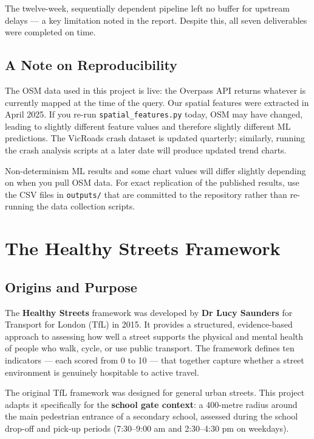 \documentclass[11pt,a4paper,openany]{book}
\begin{document}
The twelve-week, sequentially dependent pipeline left no buffer for upstream delays --- a key limitation noted in the report. Despite this, all seven deliverables were completed on time.

\section{A Note on Reproducibility}

The OSM data used in this project is live: the Overpass API returns whatever is currently mapped at the time of the query. Our spatial features were extracted in April 2025. If you re-run \texttt{spatial\_features.py} today, OSM may have changed, leading to slightly different feature values and therefore slightly different ML predictions. The VicRoads crash dataset is updated quarterly; similarly, running the crash analysis scripts at a later date will produce updated trend charts.

\begin{warnbox}{Non-determinism}
ML results and some chart values will differ slightly depending on when you pull OSM data. For exact replication of the published results, use the CSV files in \texttt{outputs/} that are committed to the repository rather than re-running the data collection scripts.
\end{warnbox}


\chapter{The Healthy Streets Framework}

\section{Origins and Purpose}

The \textbf{Healthy Streets} framework was developed by \textbf{Dr Lucy Saunders} for Transport for London (TfL) in 2015. It provides a structured, evidence-based approach to assessing how well a street supports the physical and mental health of people who walk, cycle, or use public transport. The framework defines ten indicators --- each scored from 0 to 10 --- that together capture whether a street environment is genuinely hospitable to active travel.

The original TfL framework was designed for general urban streets. This project adapts it specifically for the \textbf{school gate context}: a 400-metre radius around the main pedestrian entrance of a secondary school, assessed during the school drop-off and pick-up periods (7:30--9:00 am and 2:30--4:30 pm on weekdays).
\end{document}
